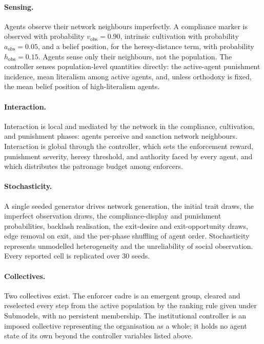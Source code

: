 \documentclass[12pt]{article}
\begin{document}
\paragraph{Sensing.} Agents observe their network neighbours imperfectly. A
compliance marker is observed with probability \(v_{\mathrm{obs}}=0.90\),
intrinsic cultivation with probability \(a_{\mathrm{obs}}=0.05\), and a belief
position, for the heresy-distance term, with probability
\(h_{\mathrm{obs}}=0.15\). Agents sense only their neighbours, not the
population. The controller senses population-level quantities directly: the
active-agent punishment incidence, mean literalism among active agents, and,
unless orthodoxy is fixed, the mean belief position of high-literalism agents.

\paragraph{Interaction.} Interaction is local and mediated by the network in the
compliance, cultivation, and punishment phases: agents perceive and sanction
network neighbours. Interaction is global through the controller, which sets the
enforcement reward, punishment severity, heresy threshold, and authority faced
by every agent, and which distributes the patronage budget among enforcers.

\paragraph{Stochasticity.} A single seeded generator drives network generation,
the initial trait draws, the imperfect observation draws, the compliance-display
and punishment probabilities, backlash realisation, the exit-desire and
exit-opportunity draws, edge removal on exit, and the per-phase shuffling of
agent order. Stochasticity represents unmodelled heterogeneity and the
unreliability of social observation. Every reported cell is replicated over 30
seeds.

\paragraph{Collectives.} Two collectives exist. The enforcer cadre is an
emergent group, cleared and reselected every step from the active population by
the ranking rule given under Submodels, with no persistent membership. The
institutional controller is an imposed collective representing the organisation
as a whole; it holds no agent state of its own beyond the controller variables
listed above.
\end{document}
